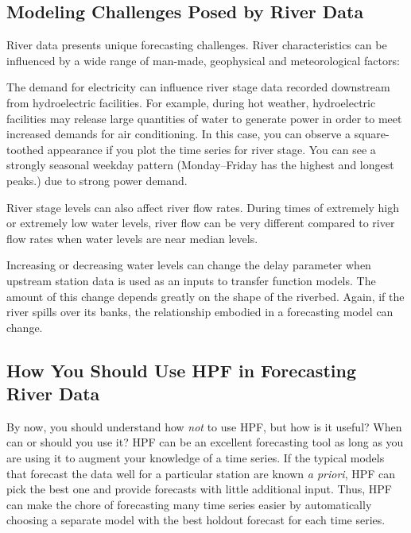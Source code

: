\documentclass[10pt]{sugconf-ish}
\begin{document}
\subsection{Modeling Challenges Posed by River Data}
River data presents unique forecasting challenges. River characteristics can be influenced by a wide range of man-made, geophysical and meteorological factors:
\begin{list}{\textbullet}{\setlength{\itemsep}{0.5\baselineskip}\setlength{\topsep}{0pt}
  \setlength{\parsep}{0pt}}
\item The demand for electricity can influence river stage data recorded downstream from hydroelectric facilities. For example, during hot weather, hydroelectric facilities may release large quantities of water to generate power in order to meet increased demands for air conditioning. In this case, you can observe a square-toothed appearance if you plot the time series for river stage. You can see a strongly seasonal weekday pattern (Monday--Friday has the highest and longest peaks.) due to strong power demand.

\item River stage levels can also affect river flow rates. During times of extremely high or extremely low water levels, river flow can be very different compared to river flow rates when water levels are near median levels.

\item Increasing or decreasing water levels can change the delay parameter when upstream station data is used as an inputs to transfer function models. The amount of this change depends greatly on the shape of the riverbed. Again, if the river spills over its banks, the relationship embodied in a forecasting model can change.
\end{list}


\subsection{How You Should Use HPF in Forecasting River Data}
By now, you should understand how \emph{not} to use HPF, but how is it useful? When can or should you use it? HPF can be an excellent forecasting tool as long as you are using it to augment your knowledge of a time series. If the typical models that forecast the data well for a particular station are known \emph{a priori}, HPF can pick the best one and provide forecasts with little additional input. Thus, HPF can make the chore of forecasting many time series easier by automatically choosing a separate model with the best holdout forecast for each time series. 
\end{document}
